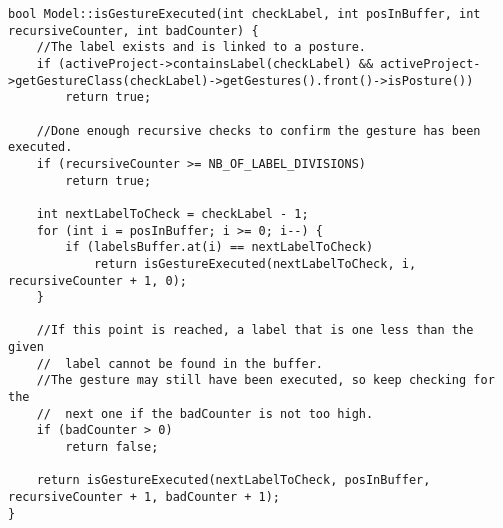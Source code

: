 \begin{lstlisting}[caption=method to verify if a gesture with given label is executed, label=code_gesture_executed]
bool Model::isGestureExecuted(int checkLabel, int posInBuffer, int recursiveCounter, int badCounter) {
	//The label exists and is linked to a posture.
	if (activeProject->containsLabel(checkLabel) && activeProject->getGestureClass(checkLabel)->getGestures().front()->isPosture())
		return true;

	//Done enough recursive checks to confirm the gesture has been executed.
	if (recursiveCounter >= NB_OF_LABEL_DIVISIONS)
		return true;

	int nextLabelToCheck = checkLabel - 1;
	for (int i = posInBuffer; i >= 0; i--) {
		if (labelsBuffer.at(i) == nextLabelToCheck)
			return isGestureExecuted(nextLabelToCheck, i, recursiveCounter + 1, 0);
	}

	//If this point is reached, a label that is one less than the given
	//	label cannot be found in the buffer.
	//The gesture may still have been executed, so keep checking for the
	//	next one if the badCounter is not too high.
	if (badCounter > 0)
		return false;
		
	return isGestureExecuted(nextLabelToCheck, posInBuffer, recursiveCounter + 1, badCounter + 1);
}
\end{lstlisting}